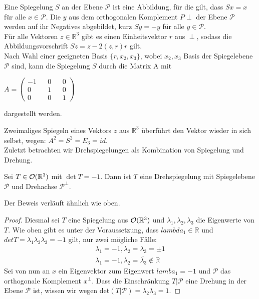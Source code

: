 \begin{bem}
Eine Spiegelung $S$ an der Ebene $\mathcal{P}$ ist eine Abbildung, für die gilt, dass $Sx=x$ für alle $x \in \mathcal{P}$. Die $y$ aus dem orthogonalen Komplement $P{\perp}$ der Ebene $\mathcal{P}$ werden auf ihr Negatives abgebildet, kurz $Sy=-y$ für alle $y\in \mathcal{P}$.\\
Für alle Vektoren $z \in \mathbb{R}^3$ gibt es einen Einheitsvektor $r$ aus ${\perp}$, sodass die Abbildungsvorschrift $Sz = z -2(z,r)r$ gilt.\\
Nach Wahl einer geeigneten Basis $\{r, x_2, x_3\}$, wobei $x_2, x_3$ Basis der Spiegelebene $\mathcal{P}$ sind, kann die Spiegelung $S$ durch die Matrix A mit
\begin{center}
  $A= \begin{pmatrix}
        -1 && 0 && 0 \\
        0 && 1 && 0 \\
        0 && 0 && 1 
       \end{pmatrix}$
 \end{center}
 dargestellt werden.
 \end{bem}
 Zweimaliges Spiegeln eines Vektors $z$ aus $\mathbb{R}^3$ überführt den Vektor wieder in sich selbst, wegen: $A^2 = S^2 = E_3 = id$.\\
 Zuletzt betrachten wir Drehspiegelungen als Kombination von Spiegelung und Drehung.
 \begin{theorem}
 Sei $T\in{\mathcal{O}(\mathbb{R}^3)}$ mit $\det T = -1$. Dann ist $T$ eine Drehspiegelung mit Spiegelebene $\mathcal{P}$ und Drehachse $\mathcal{P}^{\perp}$.
 \end{theorem}
 Der Beweis verläuft ähnlich wie oben.
 \begin{proof}
 Diesmal sei $T$ eine Spiegelung aus ${\mathcal{O}(\mathbb{R}^3)}$ und $\lambda_1,\lambda_2, \lambda_3$ die Eigenwerte von $T$. Wie oben gibt es unter der Voraussetzung, dass $lambda_1 \in \mathbb{R}$  und $det T = \lambda_1\lambda_2\lambda_3=-1$ gilt, nur zwei mögliche Fälle:
 \begin{align}
   \lambda_1=-1, \lambda_2=\lambda_3=\pm1 \\
   \lambda_1=-1, \lambda_2=\overline{\lambda_3}\notin \mathbb{R}
  \end{align}
 Sei von nun an $x$ ein Eigenvektor zum Eigenwert $lamba_1=-1$ und $\mathcal{P}$ das orthogonale Komplement $x^{\perp}$. Dass die Einschränkung $T|\mathcal{P}$ eine Drehung in der Ebene $\mathcal{P}$ ist, wissen wir wegen det$(T|\mathcal{P}) = \lambda_2\lambda_3=1.$
 \end{proof}
